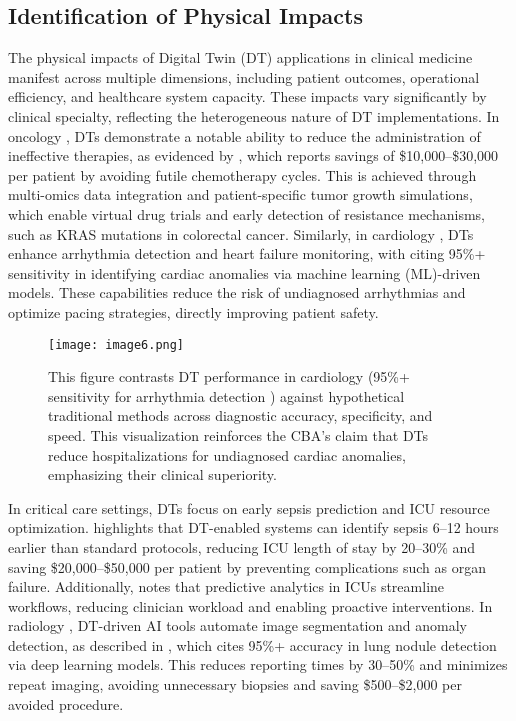 \documentclass[10pt,a4paper]{article}
\begin{document}
\subsection*{Identification of Physical Impacts}

The physical impacts of Digital Twin (DT) applications in clinical medicine manifest across multiple dimensions, including patient outcomes, operational efficiency, and healthcare system capacity. These impacts vary significantly by clinical specialty, reflecting the heterogeneous nature of DT implementations. In oncology , DTs demonstrate a notable ability to reduce the administration of ineffective therapies, as evidenced by \cite{Wang2025}, which reports savings of \$10,000–\$30,000 per patient by avoiding futile chemotherapy cycles. This is achieved through multi-omics data integration and patient-specific tumor growth simulations, which enable virtual drug trials and early detection of resistance mechanisms, such as KRAS mutations in colorectal cancer. Similarly, in cardiology , DTs enhance arrhythmia detection and heart failure monitoring, with \cite{Ahmed2023} citing 95\%+ sensitivity in identifying cardiac anomalies via machine learning (ML)-driven models. These capabilities reduce the risk of undiagnosed arrhythmias and optimize pacing strategies, directly improving patient safety.

\begin{figure} [H]
    \centering
    \texttt{[image: image6.png]}
    \caption{This figure contrasts DT performance in cardiology (95\%+ sensitivity for arrhythmia detection \cite{Ahmed2023}) against hypothetical traditional methods across diagnostic accuracy, specificity, and speed. This visualization reinforces the CBA’s claim that DTs reduce hospitalizations for undiagnosed cardiac anomalies, emphasizing their clinical superiority.}
    \label{fig:enter-label}
\end{figure}

In critical care settings, DTs focus on early sepsis prediction and ICU resource optimization. \cite{Mascret2024} highlights that DT-enabled systems can identify sepsis 6–12 hours earlier than standard protocols, reducing ICU length of stay by 20–30\% and saving \$20,000–\$50,000 per patient by preventing complications such as organ failure. Additionally, \cite{Boverhof2024} notes that predictive analytics in ICUs streamline workflows, reducing clinician workload and enabling proactive interventions. In radiology , DT-driven AI tools automate image segmentation and anomaly detection, as described in \cite{Bocean2025}, which cites 95\%+ accuracy in lung nodule detection via deep learning models. This reduces reporting times by 30–50\% and minimizes repeat imaging, avoiding unnecessary biopsies and saving \$500–\$2,000 per avoided procedure.
\end{document}
